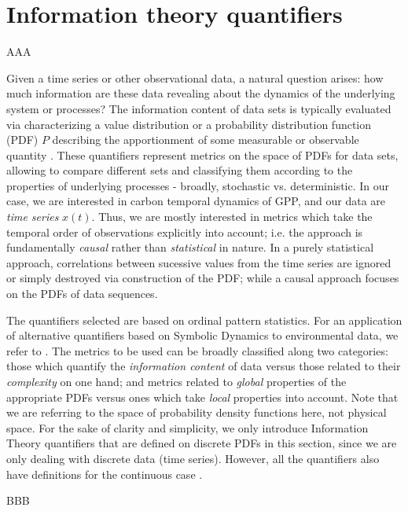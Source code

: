 \section{Information theory quantifiers}\label{sec:quanti}

AAA

Given a time series or other observational data, a natural question arises: how much information are these data revealing about the dynamics of the underlying system or processes?
The information content of data sets is typically evaluated via characterizing a value distribution or a probability distribution function (PDF) $P$ describing the apportionment of some measurable or observable quantity \cite{Gray2011}.
These quantifiers represent metrics on the space of PDFs for data sets, allowing to compare different sets and classifying them according to the properties of underlying processes - broadly, stochastic vs.  deterministic.
In our case, we are interested in carbon temporal dynamics of GPP, and our data are \textit{time series} $x(t)$. Thus, we are mostly interested in metrics which take the temporal order of observations explicitly into account; i.e. the approach is fundamentally \textit{causal} rather than \textit{statistical} in nature.
In a purely statistical approach, correlations between sucessive values from the time series are ignored or simply destroyed via construction of the PDF; while a causal approach focuses on the PDFs of data sequences. 

The quantifiers selected are based on ordinal pattern statistics.
For an application of alternative quantifiers based on Symbolic Dynamics to environmental data, we refer to \cite{Hauhs2008}.
The metrics to be used can be broadly classified along two categories: those which quantify the \textit{information content} of data versus those related to their \textit{complexity} on one hand; and metrics related to \textit{global} properties of the appropriate PDFs versus ones which take \textit{local} properties into account.
Note that we are referring to the space of probability density functions here, not physical space.
For the sake of clarity and simplicity, we only introduce Information Theory quantifiers that are defined on discrete PDFs in this section, since we are only dealing with discrete data (time series).
However, all the quantifiers also have definitions for the continuous case \cite{Shannon1948,Frieden2004} . 

BBB

